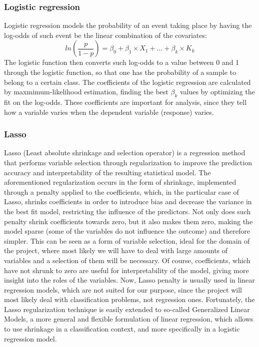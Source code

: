 \documentclass[journal]{IEEEtran}
\begin{document}
\subsubsection{Logistic regression}
Logistic regression models the probability of an event taking place by having the log-odds of such event be the linear combination of the covariates:
\begin{equation*}
ln(\frac{p}{1-p}) = \beta_0 + \beta_1\times X_1 + \ldots + \beta_k\times K_k
\end{equation*}
The logistic function then converts such log-odds to a value between 0 and 1 through the logistic function, so that one has the probability of a sample to belong to a certain class. The coefficients of the logistic regression are calculated by maxmimum-likelihood estimation, finding the best $\beta_k$ values by optimizing the fit on the log-odds. These coefficients are important for analysis, since they tell how a variable varies when the dependent variable (response) varies. 


\subsubsection{Lasso}
Lasso (Least absolute shrinkage and selection operator) is a regression method that performs variable selection through regularization to improve the prediction accuracy and interpretability of the resulting statistical model. The aforementioned regularization occurs in the form of shrinkage, implemented through a penalty applied to the coefficients, which, in the particular case of Lasso, shrinks coefficients in order to introduce bias and decrease the variance in the best fit model, restricting the influence of the predictors. Not only does such penalty shrink coefficients towards zero, but it also makes them zero, making the model sparse (some of the variables do not influence the outcome) and therefore simpler. This can be seen as a form of variable selection, ideal for the domain of the project, where most likely we will have to deal with large amounts of variables and a selection of them will be necessary. Of course, coefficients, which have not shrunk to zero are useful for interpretability of the model, giving more insight into the roles of the variables.\newline
Now, Lasso penalty is usually used in linear regression models, which are not suited for our purpose, since the project will most likely deal with classification problems, not regression ones. Fortunately, the Lasso regularization technique is easily extended to so-called Generalized Linear Models, a more general and flexible formulation of linear regression, which allows to use shrinkage in a classification context, and more specifically in a logistic regression model.
\end{document}
